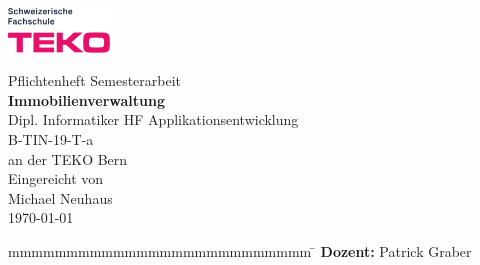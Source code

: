 \newcommand{\arbeit}{Pflichtenheft Semesterarbeit}
\newcommand{\autor}{Michael Neuhaus}
\newcommand{\gutachter}{Patrick Graber}
\newcommand{\thema}{Immobilienverwaltung}
\newcommand{\studiengang}{Dipl. Informatiker HF Applikationsentwicklung}
\newcommand{\studienjahrgang}{B-TIN-19-T-a}
\newcommand{\datumAbgabe}{\today}

\begin{titlepage}
    \includegraphics[width=2.7cm]{content/images/teko.png}
	\enlargethispage{20mm}
	\begin{center}
		\vspace*{12mm}	{\large\normalfont \arbeit}\\
		\vspace*{12mm}	{\large\bfseries \thema }\\
		\vspace*{12mm}	\studiengang\\
    \vspace*{2mm}  \studienjahrgang\\
 		\vspace*{3mm} 	an der TEKO Bern\\
		\vspace*{12mm}	Eingereicht von\\
		\vspace*{3mm} 	{\large\normalfont \autor}\\
		\vspace*{12mm}	\datumAbgabe\\
	\end{center}
	\vspace{2cm}
	\begin{figure}[htp]
		\begin{center}
		\end{center}
	\end{figure}
	\vfill
	\begin{spacing}{1.2}
		\begin{tabbing}
			mmmmmmmmmmmmmmmmmmmmmmmmmm      \= \kill
			\textbf{Dozent:}                 \>  \gutachter
		\end{tabbing}
		\end{spacing}
		\vspace*{20mm}
\end{titlepage}

